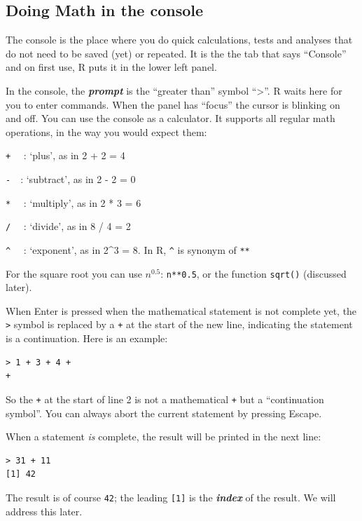 \documentclass[]{book}
\begin{document}
\hypertarget{doing-math-in-the-console}{%
\subsection{Doing Math in the console}\label{doing-math-in-the-console}}

The console is the place where you do quick calculations, tests and analyses that do not need to be saved (yet) or repeated. It is the the tab that says ``Console'' and on first use, R puts it in the lower left panel.

In the console, the \textbf{\emph{prompt}} is the ``greater than'' symbol ``\textgreater{}''. R waits here for you to enter commands. When the panel has ``focus'' the cursor is blinking on and off. You can use the console as a calculator. It supports all regular math operations, in the way you would expect them:

\texttt{+}  : `plus', as in 2 + 2 = 4

\texttt{-} : `subtract', as in 2 - 2 = 0

\texttt{*}  : `multiply', as in 2 * 3 = 6

\texttt{/}  : `divide', as in 8 / 4 = 2

\texttt{\^{}}  : `exponent', as in 2\^{}3 = 8. In R, \texttt{\^{}} is synonym of \texttt{**}

For the square root you can use \(n^{0.5}\): \texttt{n**0.5}, or the function \texttt{sqrt()} (discussed later).

When Enter is pressed when the mathematical statement is not complete yet, the \texttt{\textgreater{}} symbol is replaced by a \texttt{+} at the start of the new line, indicating the statement is a continuation. Here is an example:

\begin{verbatim}
> 1 + 3 + 4 + 
+ 
\end{verbatim}

So the \texttt{+} at the start of line 2 is not a mathematical \texttt{+} but a ``continuation symbol''. You can always abort the current statement by pressing Escape.

When a statement \emph{is} complete, the result will be printed in the next line:

\begin{verbatim}
> 31 + 11
[1] 42
\end{verbatim}

The result is of course \texttt{42}; the leading \texttt{{[}1{]}} is the \textbf{\emph{index}} of the result. We will address this later.
\end{document}
